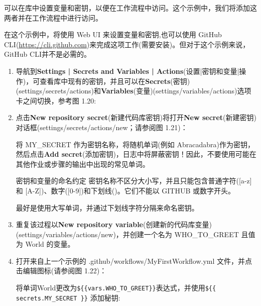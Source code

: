 
可以在库中设置变量和密钥，以便在工作流程中访问。这个示例中，我们将添加这两者并在工作流程中进行访问。


在这个示例中，将使用 Web UI 来设置变量和密钥,也可以使用 GitHub CLI(\url{https://cli.github.com})来完成这项工作(需要安装)。但对于这个示例来说，GitHub CLI并不是必需的。


\begin{enumerate}
\item 
导航到\textbf{Settings | Secrets and Variables | Actions}(设置|密钥和变量|操作)，可查看库中现有的密钥，并且可以在\textbf{Secrets}(密钥)(settings/secrets/actions)和\textbf{Variables}(变量)(settings/variables/actions)选项卡之间切换，参考图 1.20:


\item 
点击\textbf{New repository secret}(新建代码库密钥)将打开\textbf{New secret}(新建密钥)对话框(settings/secrets/actions/new；请参阅图 1.21)：


将 MY\_SECRET 作为密钥名称，将随机单词(例如 Abracadabra)作为密钥，然后点击\textbf{Add secret}(添加密钥)，日志中将屏蔽密钥！因此，不要使用可能在其他作业或步骤的输出中出现的常见单词。

\begin{myTip}{密钥和变量的命名约定}
密钥名称不区分大小写，并且只能包含普通字符([a-z] 和 [A-Z])、数字([0-9])和下划线()。它们不能以 GITHUB 或数字开头。

最好是使用大写单词，并通过下划线字符分隔来命名密钥。
\end{myTip}

\item 
重复该过程以\textbf{New repository variable}(创建新的代码库变量)(settings/variables/actions/new)，并创建一个名为 WHO\_TO\_GREET 且值为 World 的变量。

\item 
打开来自上一个示例的 .github/workflows/MyFirstWorkflow.yml 文件，并点击编辑图标(请参阅图 1.22)：


将单词World更改为\verb|${{vars.WHO_TO_GREET}}|表达式，并使用\verb|${{ secrets.MY_SECRET }}| 添加秘钥:


\end{enumerate}
